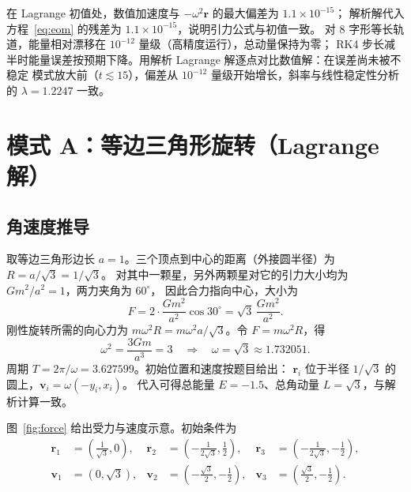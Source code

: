 \documentclass[UTF8,fontset=windows,11pt,a4paper]{ctexart}
\newcommand{\vect}[1]{\mathbf{#1}}
\begin{document}
在 Lagrange 初值处，数值加速度与 $-\omega^2\vect r$ 的最大偏差为 $1.1\times10^{-15}$；
解析解代入方程~\eqref{eq:eom} 的残差为 $1.1\times10^{-15}$，说明引力公式与初值一致。
对 8 字形等长轨道，能量相对漂移在 $10^{-12}$ 量级（高精度运行），总动量保持为零；
RK4 步长减半时能量误差按预期下降。用解析 Lagrange 解逐点对比数值解：在误差尚未被不稳定
模式放大前（$t\lesssim15$），偏差从 $10^{-12}$ 量级开始增长，斜率与线性稳定性分析的
$\lambda=1.2247$ 一致。

\section{模式 A：等边三角形旋转（Lagrange 解）}\label{sec:lagrange}

\subsection{角速度推导}
取等边三角形边长 $a=1$。三个顶点到中心的距离（外接圆半径）为 $R=a/\sqrt3=1/\sqrt3$。
对其中一颗星，另外两颗星对它的引力大小均为 $Gm^2/a^2=1$，两力夹角为 $60^\circ$，
因此合力指向中心，大小为
\begin{equation}\label{eq:force}
F=2\cdot\frac{Gm^2}{a^2}\cos30^\circ
=\sqrt3\,\frac{Gm^2}{a^2}.
\end{equation}
刚性旋转所需的向心力为 $m\omega^2R=m\omega^2a/\sqrt3$。令 $F=m\omega^2R$，得
\begin{equation}\label{eq:omega}
\omega^2=\frac{3Gm}{a^3}=3
\quad\Longrightarrow\quad
\omega=\sqrt3\approx1.732051.
\end{equation}
周期 $T=2\pi/\omega=3.627599$。初始位置和速度按题目给出：
$\vect r_i$ 位于半径 $1/\sqrt3$ 的圆上，$\vect v_i=\omega(-y_i,x_i)$。
代入可得总能量 $E=-1.5$、总角动量 $L=\sqrt3$，与解析计算一致。

图~\ref{fig:force} 给出受力与速度示意。初始条件为
\begin{align}
\vect r_1&=\left(\frac1{\sqrt3},0\right),&
\vect r_2&=\left(-\frac1{2\sqrt3},\frac12\right),&
\vect r_3&=\left(-\frac1{2\sqrt3},-\frac12\right),\label{eq:icA-r}\\
\vect v_1&=\left(0,\sqrt3\right),&
\vect v_2&=\left(-\frac{\sqrt3}{2},-\frac12\right),&
\vect v_3&=\left(\frac{\sqrt3}{2},-\frac12\right).\label{eq:icA-v}
\end{align}
\end{document}

